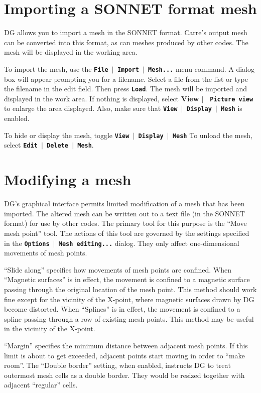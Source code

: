 \documentclass[12pt]{report}
\begin{document}
\section{Importing a SONNET format mesh}

DG allows you to import a mesh in the SONNET format.  Carre's output 
mesh can be converted into this format, as can meshes produced by other
codes.
The mesh will be 
displayed in the working area.

To import the mesh, use the
\textbf{\texttt{File $\mid$ Import $\mid$ Mesh...}} menu
command. A dialog box will appear prompting you for a filename. Select
a file from the list or type the filename in the edit field. Then press
\textbf{\texttt{Load}}. The mesh will be imported and displayed
in the work area. If nothing is displayed, select
\textbf{View  \begin{math}\vert{}\end{math} \texttt{ Picture view}} to
enlarge the area displayed. Also, make sure that
\textbf{\texttt{View $\mid$ Display $\mid$ Mesh}} is
enabled.

To hide or display the mesh, toggle
\textbf{\texttt{View $\mid$ Display $\mid$ Mesh}}
To unload the mesh, select
\textbf{\texttt{Edit $\mid$ Delete $\mid$ Mesh}}.

\section{Modifying a mesh}

DG's graphical interface permits limited modification of a mesh that has
been imported.  The altered mesh can be written out to a text file (in
the SONNET format) for use by other codes.  The primary tool for this
purpose is the ``Move mesh point'' tool.  The actions of this tool
are governed by the settings specified in the 
\textbf{\texttt{Options $\mid$ Mesh editing...}} dialog.
They only affect
one-dimensional movements of mesh
points.

``Slide along'' specifies how movements of mesh points are confined.
When ``Magnetic surfaces'' is in effect, the movement is confined to a
magnetic surface passing through the original location of the mesh
point. This method should work fine except for the vicinity of the 
X-point, where magnetic surfaces drawn by DG become distorted.
When ``Splines'' is in effect, the movement is confined to a spline
passing through a row of existing mesh points.  This method may be
useful in the vicinity of the X-point.

``Margin'' specifies the minimum distance between adjacent mesh
points. If this limit is about to get exceeded, adjacent points start
moving in order to ``make room''.
The ``Double border'' setting, when enabled, instructs DG to treat
outermost mesh cells as a double border. They would be resized
together with adjacent ``regular'' cells.
\end{document}
